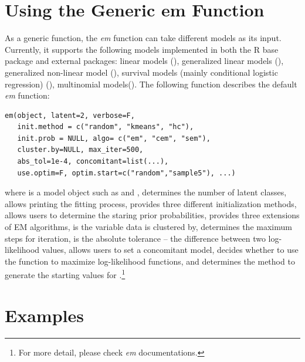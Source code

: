 \documentclass[nojss]{jss}
\begin{document}
   \section{Using the Generic em Function}
   As a generic function, the \emph{em} function can take different models as its input. Currently, it supports the following models implemented in both the R base package and external packages:  linear models (), generalized linear models (),  generalized non-linear model (),  survival models (mainly conditional logistic regression) (), multinomial models().
   The following function describes the default \emph{em} function:
\begin{lstlisting}
em(object, latent=2, verbose=F, 
   init.method = c("random", "kmeans", "hc"),
   init.prob = NULL, algo= c("em", "cem", "sem"),
   cluster.by=NULL, max_iter=500, 
   abs_tol=1e-4, concomitant=list(...),
   use.optim=F, optim.start=c("random","sample5"), ...)
\end{lstlisting}
    where  is a model object such as  and ,  determines the number of latent classes,  allows printing the fitting process,  provides three different initialization methods,  allows users to determine the staring prior probabilities,  provides three extensions of EM algorithms,  is the variable data is clustered by,  determines the maximum steps for iteration,  is the absolute tolerance -- the difference between two log-likelihood values,  allows users to set a concomitant model,  decides whether to use the function  to maximize log-likelihood functions, and  determines the method to generate the starting values for .\footnote{For more detail, please check \emph{em} documentations.}
   \section{Examples}
\end{document}
